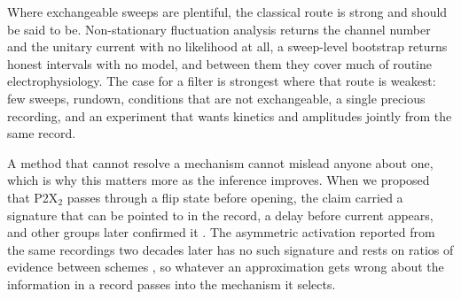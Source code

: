 Where exchangeable sweeps are plentiful, the classical route is strong and should be said to be. Non-stationary fluctuation analysis returns the channel number and the unitary current with no likelihood at all, a sweep-level bootstrap returns honest intervals with no model, and between them they cover much of routine electrophysiology. The case for a filter is strongest where that route is weakest: few sweeps, rundown, conditions that are not exchangeable, a single precious recording, and an experiment that wants kinetics and amplitudes jointly from the same record.

A method that cannot resolve a mechanism cannot mislead anyone about one, which is why this matters more as the inference improves. When we proposed that P2X$_2$ passes through a flip state before opening, the claim carried a signature that can be pointed to in the record, a delay before current appears, and other groups later confirmed it \cite{moffatthume2007responses}. %
The asymmetric activation reported from the same recordings two decades later has no such signature and rests on ratios of evidence between schemes \cite{moffatt2025bayesian}, so whatever an approximation gets wrong about the information in a record passes into the mechanism it selects.


